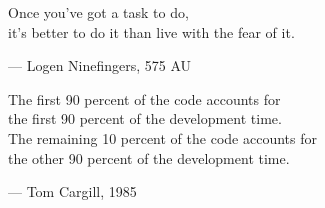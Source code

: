 \begin{flushright}
\begin{hangleftquote}{\QENOpen}{\QENClose}
Once you've got a task to do,\\
it's better to do it than live with the fear of it.
\end{hangleftquote}
\par\smallskip
\normalfont — Logen Ninefingers, 575 AU
\end{flushright}
\vspace{2em}
\begin{flushright}
\begin{hangleftquote}{\QENOpen}{\QENClose}
The first 90 percent of the code accounts for\\
the first 90 percent of the development time.\\
The remaining 10 percent of the code accounts for\\
the other 90 percent of the development time.
\end{hangleftquote}
\par\smallskip
\normalfont — Tom Cargill, 1985
\end{flushright}
